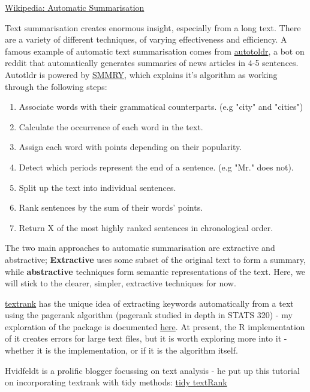 \documentclass[11pt]{article}
\begin{document}
\href{https://en.wikipedia.org/wiki/Automatic\_summarization}{Wikipedia: Automatic Summarisation}

Text summarisation creates enormous insight, especially from a long
text. There are a variety of different techniques, of varying
effectiveness and efficiency. A famous example of automatic text
summarisation comes from \href{https://www.reddit.com/user/autotldr}{autotoldr}, a bot
on reddit that automatically generates summaries of news articles in 4-5
sentences. Autotldr is powered by \href{https://smmry.com/about}{SMMRY},
which explains it's algorithm as working through the following steps:

\begin{enumerate}
\item Associate words with their grammatical counterparts. (e.g "city" and
"cities")
\item Calculate the occurrence of each word in the text.
\item Assign each word with points depending on their popularity.
\item Detect which periods represent the end of a sentence. (e.g "Mr." does
not).
\item Split up the text into individual sentences.
\item Rank sentences by the sum of their words' points.
\item Return X of the most highly ranked sentences in chronological order.
\end{enumerate}

The two main approaches to automatic summarisation are extractive and
abstractive; \textbf{Extractive} uses some subset of the original text to form
a summary, while \textbf{abstractive} techniques form semantic representations
of the text. Here, we will stick to the clearer, simpler, extractive
techniques for now.

\href{https://github.com/bnosac/textrank}{textrank} has the unique idea of
extracting keywords automatically from a text using the pagerank
algorithm (pagerank studied in depth in STATS 320) - my exploration of
the package is documented \href{./textrank\_exploration.Rmd}{here}. At
present, the R implementation of it creates errors for large text files,
but it is worth exploring more into it - whether it is the
implementation, or if it is the algorithm itself.

Hvidfeldt is a prolific blogger focussing on text analysis - he put up
this tutorial on incorporating textrank with tidy methods:
\href{https://www.hvitfeldt.me/blog/tidy-text-summarization-using-textrank/}{tidy textRank}
\end{document}
